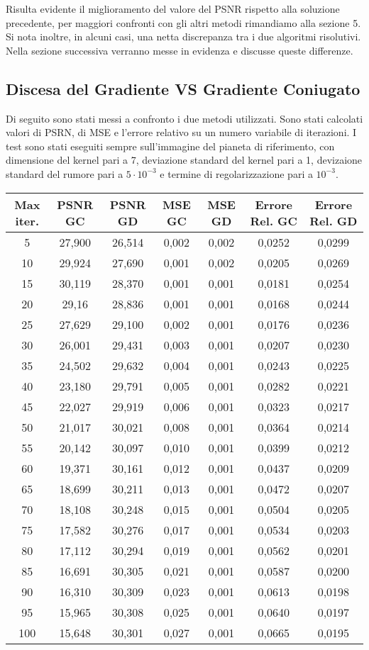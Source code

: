 \documentclass{article}
\begin{document}
Risulta evidente il miglioramento del valore del PSNR rispetto alla soluzione precedente, per maggiori confronti con gli altri metodi rimandiamo alla sezione 5. Si nota inoltre, in alcuni casi, una netta discrepanza tra i due algoritmi risolutivi. Nella sezione successiva verranno messe in evidenza e discusse queste differenze.


\subsection{Discesa del Gradiente VS Gradiente Coniugato}
Di seguito sono stati messi a confronto i due metodi utilizzati. Sono stati calcolati valori di PSRN, di MSE e l'errore relativo su un numero variabile di iterazioni. I test sono stati eseguiti sempre sull'immagine del pianeta di riferimento, con dimensione del kernel pari a 7, deviazione standard del kernel pari a 1, devizaione standard del rumore pari a $5 \cdot 10^{-3}$ e termine di regolarizzazione pari a $10^{-3}$.

 \hskip-2cm\begin{tabular}{|c||c|c||c|c||c|c|}  
\hline
 Max iter. & PSNR GC & PSNR GD & MSE GC & MSE GD & Errore Rel. GC & Errore Rel. GD\\
 \hline
5 & 27,900  & 26,514 & 0,002 & 0,002 & 0,0252 & 0,0299\\
10 & 29,924 & 27,690 & 0,001 & 0,002 & 0,0205 & 0,0269\\
15 & 30,119 & 28,370 & 0,001 & 0,001 & 0,0181 & 0,0254\\
20 & 29,16  & 28,836 & 0,001 & 0,001 & 0,0168 & 0,0244\\
25 & 27,629 & 29,100 & 0,002 & 0,001 & 0,0176 & 0,0236\\
30 & 26,001 & 29,431 & 0,003 & 0,001 & 0,0207 & 0,0230\\
35 & 24,502 & 29,632 & 0,004 & 0,001 & 0,0243 & 0,0225\\
40 & 23,180 & 29,791 & 0,005 & 0,001 & 0,0282 & 0,0221\\
45 & 22,027 & 29,919 & 0,006 & 0,001 & 0,0323 & 0,0217\\
50 & 21,017 & 30,021 & 0,008 & 0,001 & 0,0364 & 0,0214\\
55 & 20,142 & 30,097 & 0,010 & 0,001 & 0,0399 & 0,0212 \\
60 & 19,371 & 30,161 & 0,012 & 0,001 & 0,0437 & 0,0209 \\
65 & 18,699 & 30,211 & 0,013 & 0,001 & 0,0472 & 0,0207 \\
70 & 18,108 & 30,248 & 0,015 & 0,001 & 0,0504 & 0,0205 \\
75 & 17,582 & 30,276 & 0,017 & 0,001 & 0,0534 & 0,0203 \\
80 & 17,112 & 30,294 & 0,019 & 0,001 & 0,0562 & 0,0201 \\
85 & 16,691 & 30,305 & 0,021 & 0,001 & 0,0587 & 0,0200 \\
90 & 16,310 & 30,309 & 0,023 & 0,001 & 0,0613 & 0,0198 \\
95 & 15,965 & 30,308 & 0,025 & 0,001 & 0,0640 & 0,0197 \\
100 & 15,648 & 30,301 & 0,027 & 0,001 & 0,0665 & 0,0195 \\
\hline
\end{tabular}
\end{document}
